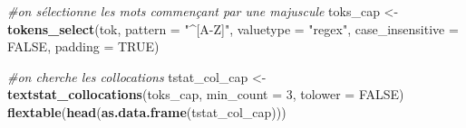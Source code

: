 \documentclass[
]{book}
\newenvironment{Shaded}{\begin{snugshade}}{\end{snugshade}}
\newcommand{\CommentTok}[1]{\textcolor[rgb]{0.56,0.35,0.01}{\textit{#1}}}
\newcommand{\DataTypeTok}[1]{\textcolor[rgb]{0.13,0.29,0.53}{#1}}
\newcommand{\DecValTok}[1]{\textcolor[rgb]{0.00,0.00,0.81}{#1}}
\newcommand{\KeywordTok}[1]{\textcolor[rgb]{0.13,0.29,0.53}{\textbf{#1}}}
\newcommand{\NormalTok}[1]{#1}
\newcommand{\OtherTok}[1]{\textcolor[rgb]{0.56,0.35,0.01}{#1}}
\newcommand{\StringTok}[1]{\textcolor[rgb]{0.31,0.60,0.02}{#1}}
\begin{document}
\begin{Shaded}
\begin{Highlighting}[]
\CommentTok{#on sélectionne les mots commençant par une majuscule}
\NormalTok{toks_cap <-}\StringTok{ }\KeywordTok{tokens_select}\NormalTok{(tok, }
                               \DataTypeTok{pattern =} \StringTok{"^[A-Z]"}\NormalTok{,}
                               \DataTypeTok{valuetype =} \StringTok{"regex"}\NormalTok{,}
                               \DataTypeTok{case_insensitive =} \OtherTok{FALSE}\NormalTok{, }
                               \DataTypeTok{padding =} \OtherTok{TRUE}\NormalTok{)}

\CommentTok{#on cherche les collocations}
\NormalTok{tstat_col_cap <-}\StringTok{ }\KeywordTok{textstat_collocations}\NormalTok{(toks_cap, }\DataTypeTok{min_count =} \DecValTok{3}\NormalTok{, }\DataTypeTok{tolower =} \OtherTok{FALSE}\NormalTok{)}
\KeywordTok{flextable}\NormalTok{(}\KeywordTok{head}\NormalTok{(}\KeywordTok{as.data.frame}\NormalTok{(tstat_col_cap)))}
\end{Highlighting}
\end{Shaded}

\providecommand{\docline}[3]{\noalign{\global\setlength{\arrayrulewidth}{#1}}\arrayrulecolor[HTML]{#2}\cline{#3}}

\setlength{\tabcolsep}{2pt}

\renewcommand*{\arraystretch}{1.5}
\end{document}
